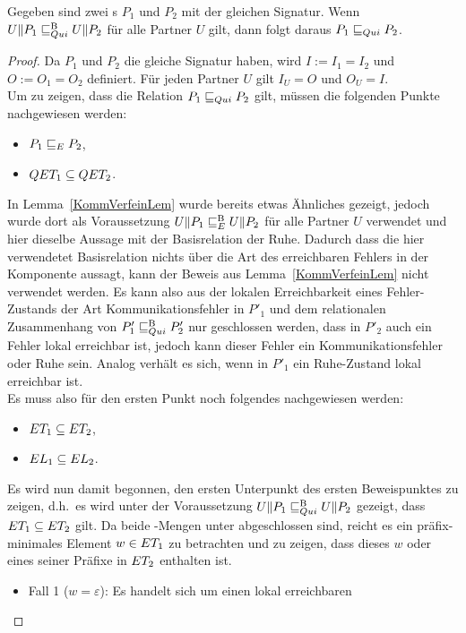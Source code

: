 \begin{Lem}
  \label{RuheVerfeinLem}
  Gegeben sind zwei \MEIO{}s $P_1$ und $P_2$ mit der gleichen Signatur. Wenn
  $U\|P_1 \sqsubseteq  _{Qui}^\mathrm{B} U\|P_2$ für alle Partner $U$ gilt, dann folgt daraus $P_1 \sqsubseteq  _{Qui}
  P_2$.
\end{Lem}
\begin{proof}
  Da $P_1$ und $P_2$ die gleiche Signatur haben, wird $I:=I_1=I_2$ und
  $O:=O_1=O_2$ definiert. Für jeden Partner $U$ gilt $I_U=O$ und $O_U=I$.\\
  Um zu zeigen, dass die Relation $P_1 \sqsubseteq  _{Qui} P_2$ gilt, müssen die folgenden
  Punkte nachgewiesen werden:
  \begin{itemize}
    \item $P_1 \sqsubseteq  _E P_2$,
    \item $QET _1\subseteq QET _2$.
  \end{itemize}
  In Lemma~\ref{KommVerfeinLem} wurde bereits etwas Ähnliches gezeigt, jedoch
  wurde dort als Voraussetzung $U\|P_1 \sqsubseteq  _E^\mathrm{B} U\|P_2$ für alle Partner $U$
  verwendet und hier dieselbe Aussage mit der Basisrelation der Ruhe. Dadurch
  dass die hier verwendetet Basisrelation nichts über die Art des erreichbaren
  Fehlers in der Komponente aussagt, kann der Beweis aus
  Lemma~\ref{KommVerfeinLem} nicht verwendet werden. Es kann also aus der
  lokalen Erreichbarkeit eines Fehler-Zustands der Art Kommunikationsfehler in
  $P'_1$ und dem relationalen Zusammenhang von $P'_1 \sqsubseteq  _{Qui}^\mathrm{B} P'_2$ nur
  geschlossen werden, dass in $P'_2$ auch ein Fehler lokal erreichbar ist,
  jedoch kann dieser Fehler ein Kommunikationsfehler oder Ruhe sein. Analog
  verhält es sich, wenn in $P'_1$ ein Ruhe-Zustand lokal erreichbar ist.\\
  Es muss also für den ersten Punkt noch folgendes nachgewiesen werden:
  \begin{itemize}
    \item $ET _1\subseteq ET _2$,
    \item $EL _1\subseteq EL _2$.
  \end{itemize}
  Es wird nun damit begonnen, den ersten Unterpunkt des ersten Beweispunktes zu
  zeigen, d.h.\ es wird unter der Voraussetzung $U\|P_1 \sqsubseteq  _{Qui}^\mathrm{B} U\|P_2$ gezeigt,
  dass $ET _1\subseteq ET _2$ gilt. Da beide \ET{}-Mengen unter \cont{}
  abgeschlossen sind, reicht es ein präfix-minimales Element $w\in ET _1$ zu
  betrachten und zu zeigen, dass dieses $w$ oder eines seiner Präfixe in $ET
  _2$ enthalten ist.
  \begin{itemize}
    \item Fall 1 ($w=\varepsilon$): Es handelt sich um einen lokal erreichbaren

\end{itemize}
\end{proof}
